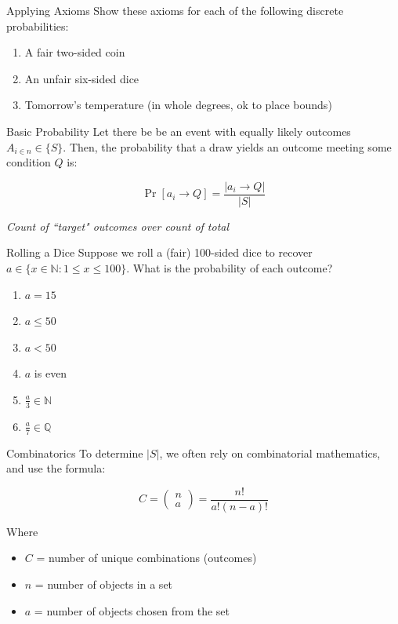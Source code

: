 \documentclass[10pt]{beamer}
\begin{document}
\begin{frame}{Applying Axioms}
    Show these axioms for each of the following discrete probabilities:

    \begin{enumerate}
        \item A fair two-sided coin
        \item An unfair six-sided dice
        \item Tomorrow's temperature (in whole degrees, ok to place bounds)
    \end{enumerate}
\end{frame}

\begin{frame}{Basic Probability}
    Let there be be an event with equally likely outcomes $A_{i \in n} \in \{S\}$. Then, the probability that a draw yields an outcome meeting some condition $ Q$ is:

    \[\Pr[a_i \rightarrow Q] = \frac{|a_i \rightarrow Q|}{|S|}\]

    \textit{Count of ``target" outcomes over count of total}
\end{frame}

\begin{frame}{Rolling a Dice}
    Suppose we roll a (fair) 100-sided dice to recover $a \in \{x \in \mathbb{N} : 1 \leq x \leq 100\}$. What is the probability of each outcome?

    \begin{enumerate}
        \item $a = 15$
        \item $a \leq 50$
        \item $a < 50$
        \item $a$ is even
        \item $\frac{a}{3} \in \mathbb{N}$
        \item $\frac{a}{7} \in \mathbb{Q}$
    \end{enumerate}
\end{frame}

\begin{frame}{Combinatorics}
    To determine $|S|$, we often rely on combinatorial mathematics, and use the formula:

    \[C = \begin{pmatrix}
        n \\
        a
    \end{pmatrix}= \frac{n!}{a!(n-a)!} \]

    Where
    \begin{itemize}
        \item $C$ = number of unique combinations (outcomes)
        \item $n$ = number of objects in a set
        \item $a$ = number of objects chosen from the set
    \end{itemize}
\end{frame}
\end{document}

